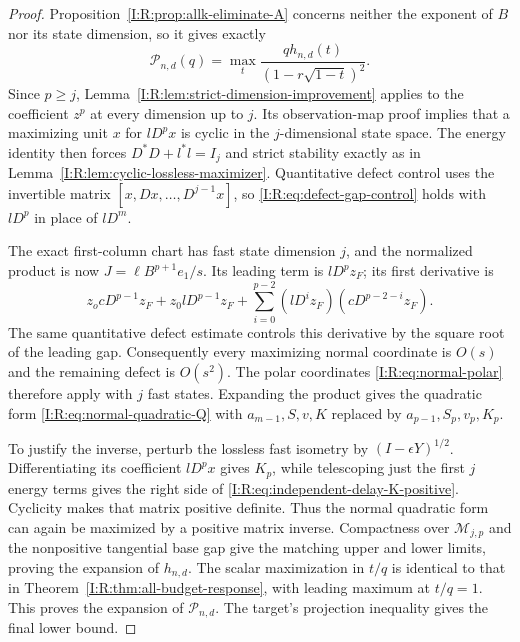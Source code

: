 \begin{proof}
Proposition~\ref{I:R:prop:allk-eliminate-A} concerns neither the exponent
of $B$ nor its state dimension, so it gives exactly
\[
 \mathcal P_{n,d}(q)=\max_t
       \frac{q h_{n,d}(t)}{(1-r\sqrt{1-t})^2}.
\]
Since $p\ge j$, Lemma~\ref{I:R:lem:strict-dimension-improvement} applies to
the coefficient $z^p$ at every dimension up to $j$.  Its observation-map
proof implies that a maximizing unit $x$ for $lD^px$ is cyclic in the
$j$-dimensional state space.  The energy identity then forces
$D^*D+l^*l=I_j$ and strict stability exactly as in
Lemma~\ref{I:R:lem:cyclic-lossless-maximizer}.  Quantitative defect control
uses the invertible matrix $[x,Dx,\ldots,D^{j-1}x]$, so
\eqref{I:R:eq:defect-gap-control} holds with $lD^p$ in place of $lD^m$.

The exact first-column chart has fast state dimension $j$, and the
normalized product is now $J=\ell B^{p+1}e_1/s$.  Its leading term is
$lD^pz_F$; its first derivative is
\[
 z_ocD^{p-1}z_F+z_0lD^{p-1}z_F
   +\sum_{i=0}^{p-2}(lD^iz_F)(cD^{p-2-i}z_F).
\]
The same quantitative defect estimate controls this derivative by the
square root of the leading gap.  Consequently every maximizing normal
coordinate is $O(s)$ and the remaining defect is $O(s^2)$.
The polar coordinates \eqref{I:R:eq:normal-polar} therefore apply with
$j$ fast states.  Expanding the product gives the quadratic form
\eqref{I:R:eq:normal-quadratic-Q} with $a_{m-1},S,v,K$ replaced by
$a_{p-1},S_p,v_p,K_p$.

To justify the inverse, perturb the lossless fast isometry by
$(I-\epsilon Y)^{1/2}$.  Differentiating its coefficient $lD^px$ gives
$K_p$, while telescoping just the first $j$ energy terms gives the right
side of \eqref{I:R:eq:independent-delay-K-positive}.  Cyclicity makes that
matrix positive definite.  Thus the normal quadratic form can again be
maximized by a positive matrix inverse.  Compactness over
$\mathcal M_{j,p}$ and the nonpositive tangential base gap give the
matching upper and lower limits, proving the expansion of $h_{n,d}$.
The scalar maximization in $t/q$ is identical to that in
Theorem~\ref{I:R:thm:all-budget-response}, with leading maximum at $t/q=1$.
This proves the expansion of $\mathcal P_{n,d}$.  The target's projection
inequality gives the final lower bound.
\end{proof}

